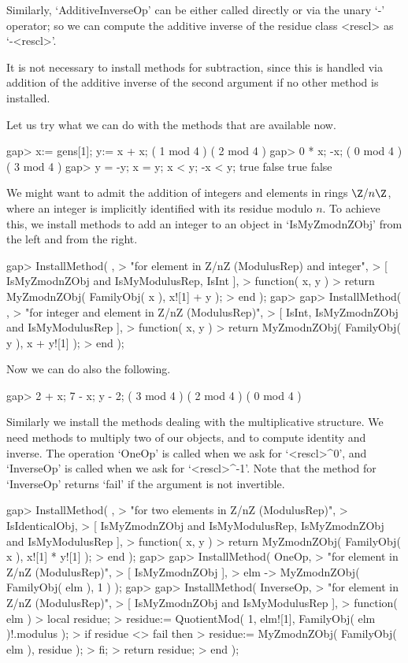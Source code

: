 Similarly, `AdditiveInverseOp' can be either called directly or via the
unary `-' operator; so we can compute the additive inverse of the
residue class <rescl> as `-<rescl>'.

It is not necessary to install methods for subtraction,
since this is handled via addition of the additive inverse of
the second argument if no other method is installed.

Let us try what we can do with the methods that are available now.

\beginexample
gap> x:= gens[1];  y:= x + x;
( 1 mod 4 )
( 2 mod 4 )
gap> 0 * x;  -x;
( 0 mod 4 )
( 3 mod 4 )
gap> y = -y;  x = y;  x < y;  -x < y;
true
false
true
false
\endexample

We might want to admit the addition of integers and elements in
rings $\Z/n\Z$, where an integer is implicitly identified
with its residue modulo $n$.
To achieve this, we install methods to add an integer to an object in
`IsMyZmodnZObj' from the left and from the right.

\beginexample
gap> InstallMethod( \+,
>    "for element in Z/nZ (ModulusRep) and integer",
>    [ IsMyZmodnZObj and IsMyModulusRep, IsInt ],
>    function( x, y )
>    return MyZmodnZObj( FamilyObj( x ), x![1] + y );
>    end );
gap> 
gap> InstallMethod( \+,
>    "for integer and element in Z/nZ (ModulusRep)",
>    [ IsInt, IsMyZmodnZObj and IsMyModulusRep ],
>    function( x, y )
>    return MyZmodnZObj( FamilyObj( y ), x + y![1] );
>    end );
\endexample

Now we can do also the following.

\beginexample
gap> 2 + x;  7 - x;  y - 2;
( 3 mod 4 )
( 2 mod 4 )
( 0 mod 4 )
\endexample

Similarly we install the methods dealing with the multiplicative
structure.
We need methods to multiply two of our objects,
and to compute identity and inverse.
The operation `OneOp' is called when we ask for `<rescl>^0',
and `InverseOp' is called when we ask for `<rescl>^-1'.
Note that the method for `InverseOp' returns `fail' if the argument
is not invertible.

\beginexample
gap> InstallMethod( \*,
>    "for two elements in Z/nZ (ModulusRep)",
>    IsIdenticalObj,
>    [ IsMyZmodnZObj and IsMyModulusRep, IsMyZmodnZObj and IsMyModulusRep ],
>    function( x, y )
>    return MyZmodnZObj( FamilyObj( x ), x![1] * y![1] );
>    end );
gap> 
gap> InstallMethod( OneOp,
>    "for element in Z/nZ (ModulusRep)",
>    [ IsMyZmodnZObj ],
>    elm -> MyZmodnZObj( FamilyObj( elm ), 1 ) );
gap> 
gap> InstallMethod( InverseOp,
>    "for element in Z/nZ (ModulusRep)",
>    [ IsMyZmodnZObj and IsMyModulusRep ],
>    function( elm )
>    local residue;
>    residue:= QuotientMod( 1, elm![1], FamilyObj( elm )!.modulus );
>    if residue <> fail then
>      residue:= MyZmodnZObj( FamilyObj( elm ), residue );
>    fi;
>    return residue;
>    end );
\endexample


